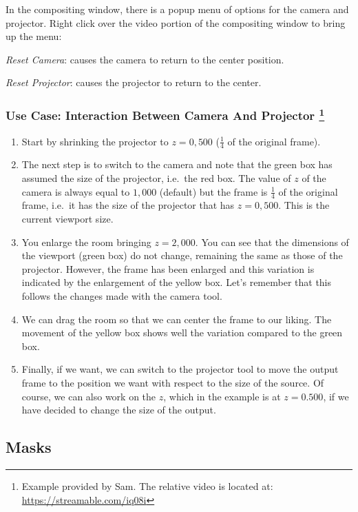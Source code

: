 In the compositing window, there is a popup menu of options for the camera and projector. Right click over the video portion of the compositing window to bring up the menu:

\textit{Reset Camera}: causes the camera to return to the center position.
    	
\textit{Reset Projector}: causes the projector to return to the center.

\subsubsection*{Use Case: Interaction Between Camera And Projector \protect\footnote{Example provided by Sam. The relative video is located at: \url{https://streamable.com/iq08i}}}%
\label{ssub:use_case_interaction_camera_projector}

\begin{enumerate}
    \item Start by shrinking the projector to $z=0,500$ ($\frac{1}{4}$ of the original frame).
    \item The next step is to switch to the camera and note that the green box has assumed the size of the projector, i.e.\ the red box. The value of $z$ of the camera is always equal to $1,000$ (default) but the frame is $\frac{1}{4}$ of the original frame, i.e.\ it has the size of the projector that has $z=0,500$. This is the current viewport size.
    \item You enlarge the room bringing $z=2,000$. You can see that the dimensions of the viewport (green box) do not change, remaining the same as those of the projector. However, the frame has been enlarged and this variation is indicated by the enlargement of the yellow box. Let's remember that this follows the changes made with the camera tool.
    \item We can drag the room so that we can center the frame to our liking. The movement of the yellow box shows well the variation compared to the green box.
    \item Finally, if we want, we can switch to the projector tool to move the output frame to the position we want with respect to the size of the source. Of course, we can also work on the $z$, which in the example is at $z=0.500$, if we have decided to change the size of the output.
\end{enumerate}

\subsection{Masks}%
\label{sub:masks}

